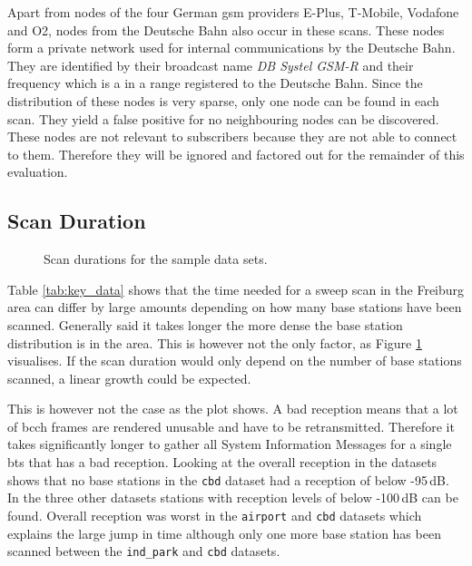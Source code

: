 Apart from nodes of the four German \gls{gsm} providers E-Plus, T-Mobile, Vodafone and O2, nodes from the Deutsche Bahn also occur in these scans.
These nodes form a private network used for internal communications by the Deutsche Bahn.
They are identified by their broadcast name \emph{DB Systel GSM-R} and their frequency which is a in a range registered to the Deutsche Bahn.
Since the distribution of these nodes is very sparse, only one node can be found in each scan. 
They yield a false positive for no neighbouring nodes can be discovered.
These nodes are not relevant to subscribers because they are not able to connect to them.
Therefore they will be ignored and factored out for the remainder of this evaluation.

\subsection{Scan Duration}
\begin{figure}
\centering
{}
\caption{Scan durations for the sample data sets.}
\label{fig:durations}
\end{figure}
Table \ref{tab:key_data} shows that the time needed for a sweep scan in the Freiburg area can differ by large amounts depending on how many base stations have been scanned.
Generally said it takes longer the more dense the base station distribution is in the area.
This is however not the only factor, as Figure \ref{fig:durations} visualises.
If the scan duration would only depend on the number of base stations scanned, a linear growth could be expected.

This is however not the case as the plot shows.
A bad reception means that a lot of \gls{bcch} frames are rendered unusable and have to be retransmitted.
Therefore it takes significantly longer to gather all System Information Messages for a single \gls{bts} that has a bad reception.
Looking at the overall reception in the datasets shows that no base stations in the \texttt{cbd} dataset had a reception of below -95\,dB.
In the three other datasets stations with reception levels of below -100\,dB can be found.
Overall reception was worst in the \texttt{airport} and \texttt{cbd} datasets which explains the large jump in time although only one more base station has been scanned between the \texttt{ind\_park} and \texttt{cbd} datasets.

